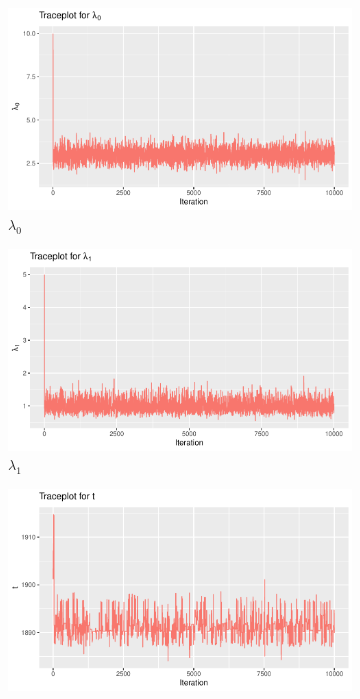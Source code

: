 \begin{figure}[H]
    \centering
    \begin{subfigure}[b]{0.45\textwidth}
        \centering
        \includegraphics[width = \textwidth]{Images/block_sim_lambda0.pdf}
        \caption{$\lambda_0$}
    \end{subfigure}
    \begin{subfigure}[b]{0.45\textwidth}
        \centering
        \includegraphics[width = \textwidth]{Images/block_sim_lambda1.pdf}
        \caption{$\lambda_1$}
    \end{subfigure}
    \begin{subfigure}[b]{0.45\textwidth}
        \centering
        \includegraphics[width = \textwidth]{Images/block_sim_t_sigma10.pdf}

\end{subfigure}
\end{figure}
